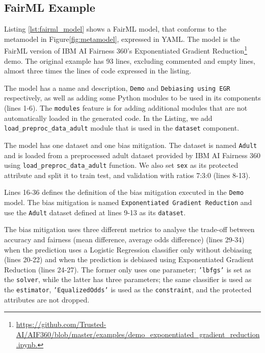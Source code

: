 \documentclass[sigconf,review]{acmart}
\begin{document}
	
	
	\subsection{FairML Example}
	\label{sec:fairml_example}
	Listing \ref{lst:fairml_model} shows a FairML model, that conforms to the metamodel in Figure\ref{fig:metamodel}, expressed in YAML. The model is the FairML version of 
	IBM AI Fairness 360's Exponentiated Gradient Reduction\footnote{\url{https://github.com/Trusted-AI/AIF360/blob/master/examples/demo_exponentiated_gradient_reduction.ipynb.}} demo. The original example has 93 lines, excluding commented and empty lines, almost three times the lines of code expressed in the listing.
	
	The model has a name and description, \texttt{Demo} and \texttt{Debiasing using EGR} respectively, as well as adding some Python modules to be used in its components (lines 1-6). The \texttt{modules} feature is for adding additional modules that are not automatically loaded in the generated code. In the Listing, we add \texttt{load\_preproc\_data\_adult} module that is used in the \texttt{dataset} component.
	
	The model has one dataset and one bias mitigation. The dataset is named \texttt{Adult} and is loaded from a preprocessed adult dataset provided by IBM AI Fairness 360 using \texttt{load\_preproc\_data\_adult} function. We also set \texttt{sex} as its protected attribute and split it to train test, and validation with ratios 7:3:0 (lines 8-13). 
	
	Lines 16-36 defines the definition of the bias mitigation executed in the \texttt{Demo} model. The bias mitigation is named \texttt{Exponentiated Gradient Reduction} and use the \texttt{Adult} dataset defined at lines 9-13 as its \texttt{dataset}. 
	
	The bias mitigation uses three different metrics to analyse the trade-off between accuracy and fairness (mean difference, average odds difference) (lines 29-34) when the prediction uses a Logistic Regression classifier only without debiasing (lines 20-22) and when the prediction is debiased using Exponentiated Gradient Reduction (lines 24-27). The former only uses one parameter; \texttt{'lbfgs'} is set as the \texttt{solver}, while the latter has three parameters; the same classifier is used as the \texttt{estimator}, \texttt{'EqualizedOdds'} is used as the \texttt{constraint}, and the protected attributes are not dropped.
	
\end{document}
